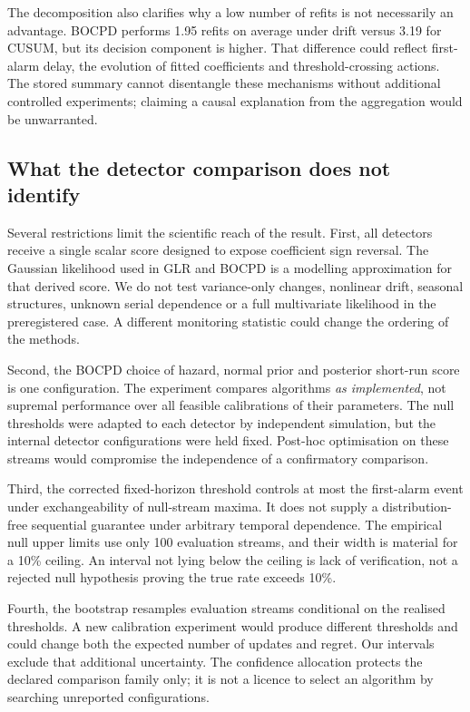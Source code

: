 \documentclass[11pt,a4paper]{article}
\begin{document}
The decomposition also clarifies why a low number of refits is not necessarily an advantage. BOCPD performs 1.95 refits on average under drift versus 3.19 for CUSUM, but its decision component is higher. That difference could reflect first-alarm delay, the evolution of fitted coefficients and threshold-crossing actions. The stored summary cannot disentangle these mechanisms without additional controlled experiments; claiming a causal explanation from the aggregation would be unwarranted.

\subsection{What the detector comparison does not identify}
Several restrictions limit the scientific reach of the result. First, all detectors receive a single scalar score designed to expose coefficient sign reversal. The Gaussian likelihood used in GLR and BOCPD is a modelling approximation for that derived score. We do not test variance-only changes, nonlinear drift, seasonal structures, unknown serial dependence or a full multivariate likelihood in the preregistered case. A different monitoring statistic could change the ordering of the methods.

Second, the BOCPD choice of hazard, normal prior and posterior short-run score is one configuration. The experiment compares algorithms \emph{as implemented}, not supremal performance over all feasible calibrations of their parameters. The null thresholds were adapted to each detector by independent simulation, but the internal detector configurations were held fixed. Post-hoc optimisation on these streams would compromise the independence of a confirmatory comparison.

Third, the corrected fixed-horizon threshold controls at most the first-alarm event under exchangeability of null-stream maxima. It does not supply a distribution-free sequential guarantee under arbitrary temporal dependence. The empirical null upper limits use only 100 evaluation streams, and their width is material for a 10\% ceiling. An interval not lying below the ceiling is lack of verification, not a rejected null hypothesis proving the true rate exceeds 10\%.

Fourth, the bootstrap resamples evaluation streams conditional on the realised thresholds. A new calibration experiment would produce different thresholds and could change both the expected number of updates and regret. Our intervals exclude that additional uncertainty. The confidence allocation protects the declared comparison family only; it is not a licence to select an algorithm by searching unreported configurations.
\end{document}
